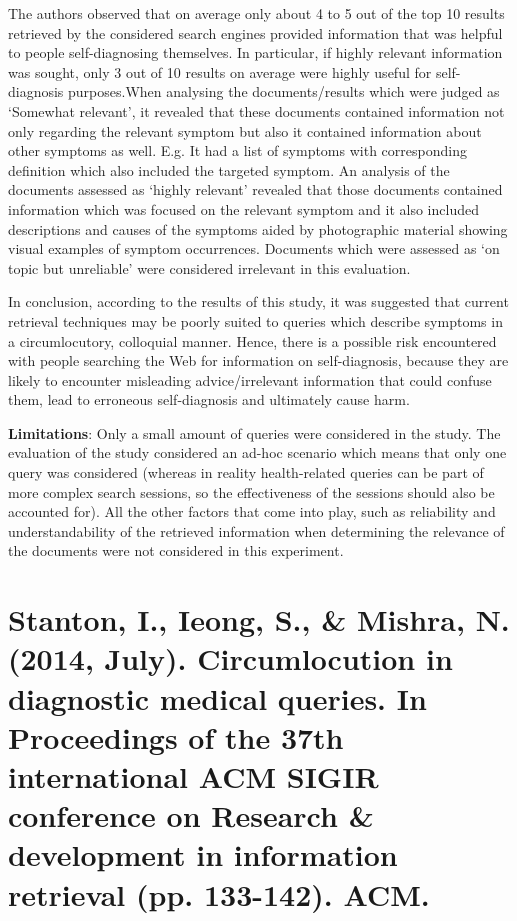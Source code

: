 \documentclass[]{article}
\begin{document}
The authors observed that on average only about 4 to 5 out of the top 10 results retrieved by the considered search engines provided information that was helpful to people self-diagnosing themselves. In particular, if highly relevant information was sought, only 3 out of 10 results on average were highly useful for self-diagnosis purposes.When analysing the documents/results which were judged as ‘Somewhat relevant’, it revealed that these documents contained information not only regarding the relevant symptom but also it contained information about other symptoms as well. E.g. It had a list of symptoms with corresponding definition which also included the targeted symptom. An analysis of the documents assessed as ‘highly relevant’ revealed that those documents contained information which was focused on the relevant symptom and it also included descriptions and causes of the symptoms aided by photographic material showing visual examples of symptom occurrences. Documents which were assessed as ‘on topic but unreliable’ were considered irrelevant in this evaluation.

In conclusion, according to the results of this study, it was suggested that current retrieval techniques may be poorly suited to queries which describe symptoms in a circumlocutory, colloquial manner. Hence, there is a possible risk encountered with people searching the Web for information on self-diagnosis, because they are likely to encounter misleading advice/irrelevant information that could confuse them, lead to erroneous self-diagnosis and ultimately cause harm. 

\textbf{Limitations}: Only a small amount of queries were considered in the study. The evaluation of the study considered an ad-hoc scenario which means that only one query was considered (whereas in reality health-related queries can be part of more complex search sessions, so the effectiveness of the sessions should also be accounted for). All the other factors that come into play, such as reliability and understandability of the retrieved information when determining the relevance of the documents were not considered in this experiment. 

\section{Stanton, I., Ieong, S., \& Mishra, N. (2014, July). Circumlocution in diagnostic medical queries. In Proceedings of the 37th international ACM SIGIR conference on Research \& development in information retrieval (pp. 133-142). ACM.}
\end{document}
